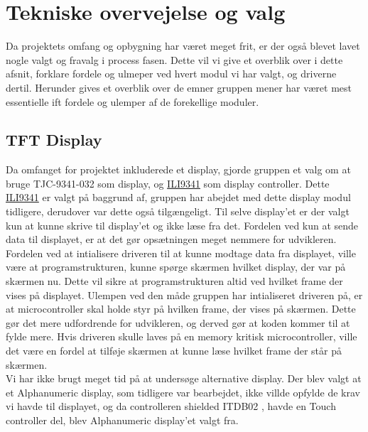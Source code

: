 \graphicspath{{Chapters/Alternative/}}


\section{Tekniske overvejelse og valg}


Da projektets omfang og opbygning har været meget frit, er der også blevet lavet nogle valgt og fravalg i process fasen. Dette vil vi give et overblik over i dette afsnit, forklare fordele og ulmeper ved hvert modul vi har valgt, og driverne dertil. Herunder gives et overblik over de emner gruppen mener har været mest essentielle ift fordele og ulemper af de forekellige moduler. 

\subsection{TFT Display} 
Da omfanget for projektet inkluderede et display, gjorde gruppen et valg om at bruge TJC-9341-032 som display, og \href{https://blackboard.au.dk/bbcswebdav/pid-1697983-dt-content-rid-3847230_1/courses/BB-Cou-UUVA-73302/BB-Cou-UUVA-65758_ImportedContent_20170106021228/BB-Cou-STADS-UUVA-52360_ImportedContent_20160107025559/LAB/Lab3a%20Graphic%20LCD%20Display/Files%20for%20LAB3a/ILI9341_v1.11.pdf}{ILI9341} 
som display controller. Dette \href{https://blackboard.au.dk/bbcswebdav/pid-1697983-dt-content-rid-3847230_1/courses/BB-Cou-UUVA-73302/BB-Cou-UUVA-65758_ImportedContent_20170106021228/BB-Cou-STADS-UUVA-52360_ImportedContent_20160107025559/LAB/Lab3a%20Graphic%20LCD%20Display/Files%20for%20LAB3a/ILI9341_v1.11.pdf}{ILI9341} 
er valgt på baggrund af, gruppen har abejdet med dette display modul tidligere, derudover var dette også tilgængeligt.
Til selve display'et er der valgt kun at kunne skrive til display'et og ikke læse fra det. Fordelen ved kun at sende data til displayet, er at det gør opsætningen meget nemmere for udvikleren. \\
Fordelen ved at intialisere driveren til at kunne modtage data fra displayet, ville være at programstrukturen, kunne spørge skærmen hvilket display, der var på skærmen nu. Dette vil sikre at programstrukturen altid ved hvilket frame der vises på displayet. Ulempen ved den måde gruppen har intialiseret driveren på, er at microcontroller skal holde styr på hvilken frame, der vises på skærmen. Dette gør det mere udfordrende for udvikleren, og derved gør at koden kommer til at fylde mere. Hvis driveren skulle laves på en memory kritisk microcontroller, ville det være en fordel at tilføje skærmen at kunne læse hvilket frame der står på skærmen. \\
Vi har ikke brugt meget tid på at undersøge alternative display. Der blev valgt at et Alphanumeric display, som tidligere var bearbejdet, ikke villde opfylde de krav vi havde til displayet, og da controlleren shielded ITDB02 
, havde en Touch controller del, blev Alphanumeric display'et valgt fra.

